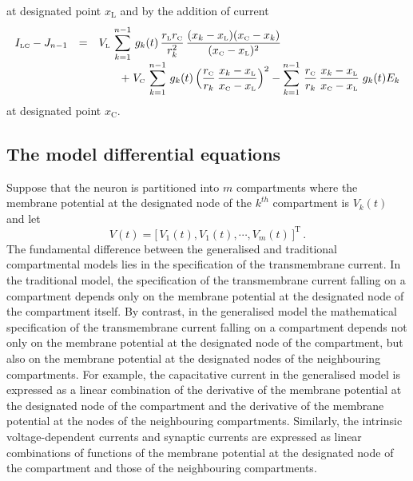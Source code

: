 at designated point $x_\mathrm{L}$ and by the addition of current
\begin{equation}\label{si5}
\begin{array}{rcl}
I_{\mbox{\tiny LC}}-J_{n-1} & = & \displaystyle V_{\mbox{\tiny L}}\,
\sum_{k=1}^{n-1}\,g_k(t)\,\frac{r_{\mbox{\tiny L}}r_{\mbox{\tiny C}}}{r^2_k}\,
\frac{(x_k-x_{\mbox{\tiny L}})(x_{\mbox{\tiny C}}-x_k)}
{(x_{\mbox{\tiny C}}-x_{\mbox{\tiny L}})^2}\\[10pt]
&&\qquad\displaystyle+\;V_{\mbox{\tiny C}}\,\sum_{k=1}^{n-1}\,g_k(t)\,
\Big(\frac{r_{\mbox{\tiny C}}}{r_k}\,\frac{x_k-x_{\mbox{\tiny L}}}
{x_{\mbox{\tiny C}}-x_{\mbox{\tiny L}}}\Big)^2-\sum_{k=1}^{n-1}\,
\frac{r_{\mbox{\tiny C}}}{r_k}\,
\frac{x_k-x_{\mbox{\tiny L}}}{x_{\mbox{\tiny C}}-x_{\mbox{\tiny L}}}\;g_k(t) E_k
\end{array}
\end{equation}
at designated point $x_\mathrm{C}$.

\subsection{The model differential equations}
Suppose that the neuron is partitioned into $m$ compartments where
the membrane potential at the designated node of the $k^{th}$
compartment is $V_k(t)$ and let
\begin{equation}\label{gmde1}
V(t)=\big[\,V_1(t),V_1(t),\cdots,V_m(t)\,]^\mathrm{T}\,.
\end{equation}
The fundamental difference between the generalised and traditional
compartmental models lies in the specification of the
transmembrane current. In the traditional model, the specification
of the transmembrane current falling on a compartment depends only
on the membrane potential at the designated node of the
compartment itself. By contrast, in the generalised model the
mathematical specification of the transmembrane current falling on
a compartment depends not only on the membrane potential at the
designated node of the compartment, but also on the membrane
potential at the designated nodes of the neighbouring
compartments. For example, the capacitative current in the
generalised model is expressed as a linear combination of the
derivative of the membrane potential at the designated node of the
compartment and the derivative of the membrane potential at the
nodes of the neighbouring compartments. Similarly, the intrinsic
voltage-dependent currents and synaptic currents are expressed as
linear combinations of functions of the membrane potential at the
designated node of the compartment and those of the neighbouring
compartments.


